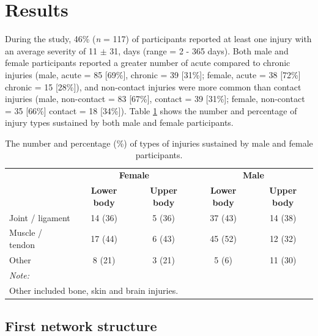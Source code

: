 \documentclass[
  english,
  man]{apa6}
\begin{document}
\hypertarget{results}{%
\section{Results}\label{results}}

During the study, 46\% (\emph{n} = 117) of participants reported at least one injury with an average severity of 11 \(\pm\) 31, days (range = 2 - 365 days).
Both male and female participants reported a greater number of acute compared to chronic injuries (male, acute = 85 {[}69\%{]}, chronic = 39 {[}31\%{]}; female, acute = 38 {[}72\%{]} chronic = 15 {[}28\%{]}), and non-contact injuries were more common than contact injuries (male, non-contact = 83 {[}67\%{]}, contact = 39 {[}31\%{]}; female, non-contact = 35 {[}66\%{]} contact = 18 {[}34\%{]}).
Table \ref{tab:table3} shows the number and percentage of injury types sustained by both male and female participants.

\begin{table}[H]

\caption{\label{tab:table3}The number and percentage (\%) of types of injuries sustained by male and female participants.}
\centering
\begin{tabular}[t]{l|c|c|c|c}
\hline
\multicolumn{1}{c|}{\textbf{ }} & \multicolumn{2}{c|}{\textbf{Female}} & \multicolumn{2}{c}{\textbf{Male}} \\
\cline{2-3} \cline{4-5}
\textbf{} & \textbf{Lower body} & \textbf{Upper body} & \textbf{Lower body} & \textbf{Upper body}\\
\hline
Joint / ligament & 14 (36) & 5 (36) & 37 (43) & 14 (38)\\
\hline
Muscle / tendon & 17 (44) & 6 (43) & 45 (52) & 12 (32)\\
\hline
Other & 8 (21) & 3 (21) & 5 (6) & 11 (30)\\
\hline
\multicolumn{5}{l}{\textit{Note: }}\\
\multicolumn{5}{l}{Other included bone, skin and brain injuries.}\\
\end{tabular}
\end{table}

\hypertarget{first-network-structure}{%
\subsection{First network structure}\label{first-network-structure}}
\end{document}
